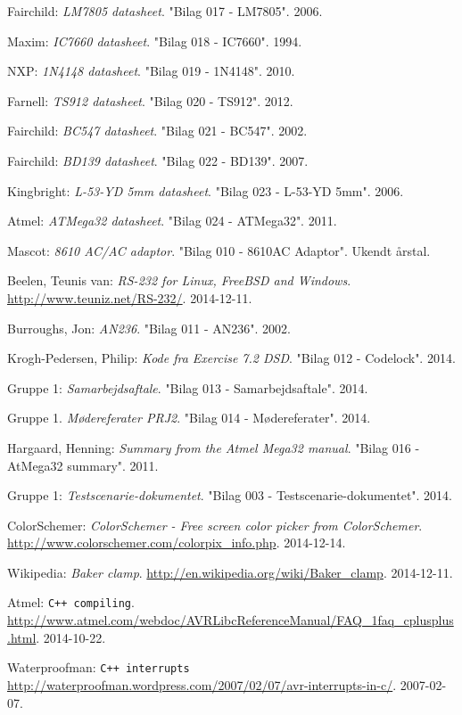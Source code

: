 \renewcommand{\bibname}{Litteraturliste}
\begin{thebibliography}{2}

 Fairchild: \textit{LM7805 datasheet}. "Bilag 017 - LM7805". 2006.

 Maxim: \textit{IC7660 datasheet}. "Bilag 018 - IC7660". 1994.

 NXP: \textit{1N4148 datasheet}. "Bilag 019 - 1N4148". 2010.

 Farnell: \textit{TS912 datasheet}. "Bilag 020 - TS912". 2012.

 Fairchild: \textit{BC547 datasheet}. "Bilag 021 - BC547". 2002.

 Fairchild: \textit{BD139 datasheet}. "Bilag 022 - BD139". 2007.

 Kingbright: \textit{L-53-YD 5mm datasheet}. "Bilag 023 - L-53-YD 5mm". 2006.

 Atmel: \textit{ATMega32 datasheet}. "Bilag 024 - ATMega32". 2011. 

 Mascot: \textit{8610 AC/AC adaptor}. "Bilag 010 - 8610AC Adaptor". Ukendt årstal.

 Beelen, Teunis van: \textit{RS-232 for Linux, FreeBSD and Windows}. \url{http://www.teuniz.net/RS-232/}. 2014-12-11.

 Burroughs, Jon: \textit{AN236}. "Bilag 011 - AN236". 2002.

 Krogh-Pedersen, Philip: \textit{Kode fra Exercise 7.2 DSD}. "Bilag 012 - Codelock". 2014.
 
 Gruppe 1: \textit{Samarbejdsaftale}. "Bilag 013 - Samarbejdsaftale". 2014.

 Gruppe 1. \textit{Mødereferater PRJ2}. "Bilag 014 - Mødereferater". 2014.

 Hargaard, Henning: \textit{Summary from the Atmel Mega32 manual}. "Bilag 016 - AtMega32 summary". 2011.

 Gruppe 1: \textit{Testscenarie-dokumentet}. "Bilag 003 - Testscenarie-dokumentet". 2014.

 ColorSchemer: \textit{ColorSchemer - Free screen color picker from ColorSchemer}. \url{http://www.colorschemer.com/colorpix_info.php}. 2014-12-14.

 Wikipedia: \textit{Baker clamp}. \url{http://en.wikipedia.org/wiki/Baker_clamp}. 2014-12-11.

 Atmel: \texttt{C++ compiling}. \url{http://www.atmel.com/webdoc/AVRLibcReferenceManual/FAQ_1faq_cplusplus.html}. 2014-10-22.

 Waterproofman: \texttt{C++ interrupts} \url{http://waterproofman.wordpress.com/2007/02/07/avr-interrupts-in-c/}. 2007-02-07.
\end{thebibliography}
